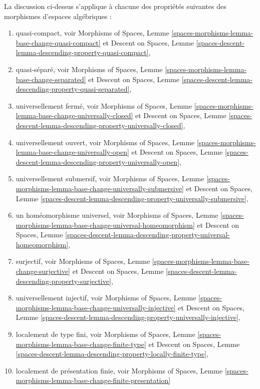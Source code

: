 \medskip\noindent
La discussion ci-dessus s'applique à chacune des propriétés suivantes des
morphismes d'espaces algébriques :
\begin{enumerate}
\item quasi-compact, voir
Morphisms of Spaces,
Lemme \ref{spaces-morphisms-lemma-base-change-quasi-compact}
et
Descent on Spaces,
Lemme \ref{spaces-descent-lemma-descending-property-quasi-compact},
\item quasi-séparé, voir
Morphisms of Spaces,
Lemme \ref{spaces-morphisms-lemma-base-change-separated}
et
Descent on Spaces,
Lemme \ref{spaces-descent-lemma-descending-property-quasi-separated},
\item universellement fermé, voir
Morphisms of Spaces,
Lemme \ref{spaces-morphisms-lemma-base-change-universally-closed}
et
Descent on Spaces,
Lemme \ref{spaces-descent-lemma-descending-property-universally-closed},
\item universellement ouvert, voir
Morphisms of Spaces,
Lemme \ref{spaces-morphisms-lemma-base-change-universally-open}
et
Descent on Spaces,
Lemme \ref{spaces-descent-lemma-descending-property-universally-open},
\item universellement submersif, voir
Morphisms of Spaces,
Lemme \ref{spaces-morphisms-lemma-base-change-universally-submersive}
et
Descent on Spaces,
Lemme \ref{spaces-descent-lemma-descending-property-universally-submersive},
\item un homéomorphisme universel, voir
Morphisms of Spaces,
Lemme \ref{spaces-morphisms-lemma-base-change-universal-homeomorphism}
et
Descent on Spaces,
Lemme \ref{spaces-descent-lemma-descending-property-universal-homeomorphism},
\item surjectif, voir
Morphisms of Spaces,
Lemme \ref{spaces-morphisms-lemma-base-change-surjective}
et
Descent on Spaces,
Lemme \ref{spaces-descent-lemma-descending-property-surjective},
\item universellement injectif, voir
Morphisms of Spaces,
Lemme \ref{spaces-morphisms-lemma-base-change-universally-injective}
et
Descent on Spaces,
Lemme \ref{spaces-descent-lemma-descending-property-universally-injective},
\item localement de type fini, voir
Morphisms of Spaces,
Lemme \ref{spaces-morphisms-lemma-base-change-finite-type}
et
Descent on Spaces,
Lemme \ref{spaces-descent-lemma-descending-property-locally-finite-type},
\item localement de présentation finie, voir
Morphisms of Spaces,
Lemme \ref{spaces-morphisms-lemma-base-change-finite-presentation}

\end{enumerate}
